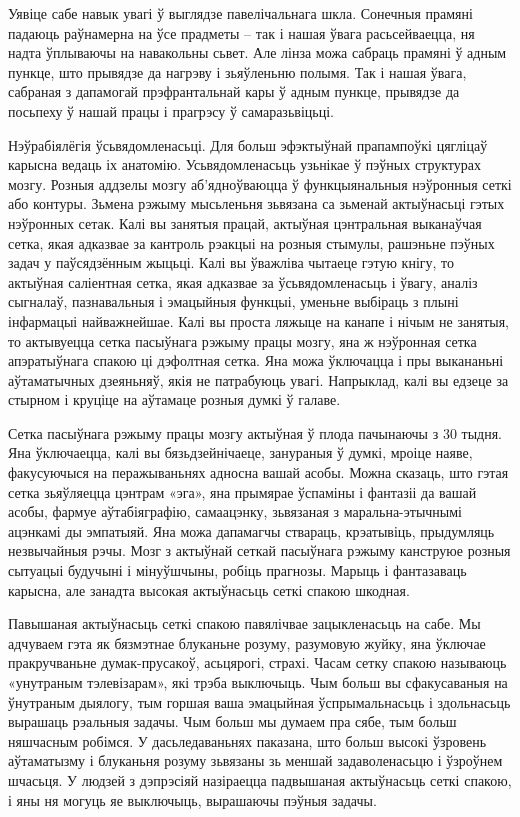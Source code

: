 Уявіце сабе навык увагі ў выглядзе павелічальнага шкла. Сонечныя прамяні падаюць раўнамерна на ўсе прадметы – так і нашая ўвага расьсейваецца, ня надта ўплываючы на навакольны сьвет. Але лінза можа сабраць прамяні ў адным пункце, што прывядзе да нагрэву і зьяўленьню полымя. Так і нашая ўвага, сабраная з дапамогай прэфрантальнай кары ў адным пункце, прывядзе да посьпеху ў нашай працы і прагрэсу ў самаразьвіцьці.

Нэўрабіялёгія ўсьвядомленасьці. Для больш эфэктыўнай прапампоўкі цягліцаў карысна ведаць іх анатомію. Усьвядомленасьць узьнікае ў пэўных структурах мозгу. Розныя аддзелы мозгу аб'ядноўваюцца ў функцыянальныя нэўронныя сеткі або контуры. Зьмена рэжыму мысьленьня зьвязана са зьменай актыўнасьці гэтых нэўронных сетак. Калі вы занятыя працай, актыўная цэнтральная выканаўчая сетка, якая адказвае за кантроль рэакцыі на розныя стымулы, рашэньне пэўных задач у паўсядзённым жыцьці. Калі вы ўважліва чытаеце гэтую кнігу, то актыўная саліентная сетка, якая адказвае за ўсьвядомленасьць і ўвагу, аналіз сыгналаў, пазнавальныя і эмацыйныя функцыі, уменьне выбіраць з плыні інфармацыі найважнейшае. Калі вы проста ляжыце на канапе і нічым не занятыя, то актывуецца сетка пасыўнага рэжыму працы мозгу, яна ж нэўронная сетка апэратыўнага спакою ці дэфолтная сетка. Яна можа ўключацца і пры выкананьні аўтаматычных дзеяньняў, якія не патрабуюць увагі. Напрыклад, калі вы едзеце за стырном і круціце на аўтамаце розныя думкі ў галаве.

Сетка пасыўнага рэжыму працы мозгу актыўная ў плода пачынаючы з 30 тыдня. Яна ўключаецца, калі вы бязьдзейнічаеце, занураныя ў думкі, мроіце наяве, факусуючыся на перажываньнях адносна вашай асобы. Можна сказаць, што гэтая сетка зьяўляецца цэнтрам «эга», яна прымярае ўспаміны і фантазіі да вашай асобы, фармуе аўтабіяграфію, самаацэнку, зьвязаная з маральна-этычнымі ацэнкамі ды эмпатыяй. Яна можа дапамагчы ствараць, крэатывіць, прыдумляць незвычайныя рэчы. Мозг з актыўнай сеткай пасыўнага рэжыму канструюе розныя сытуацыі будучыні і мінуўшчыны, робіць прагнозы. Марыць і фантазаваць карысна, але занадта высокая актыўнасьць сеткі спакою шкодная.

Павышаная актыўнасьць сеткі спакою павялічвае зацыкленасьць на сабе. Мы адчуваем гэта як бязмэтнае блуканьне розуму, разумовую жуйку, яна ўключае пракручваньне думак-прусакоў, асьцярогі, страхі. Часам сетку спакою называюць «унутраным тэлевізарам», які трэба выключыць. Чым больш вы сфакусаваныя на ўнутраным дыялогу, тым горшая ваша эмацыйная ўспрымальнасьць і здольнасьць вырашаць рэальныя задачы. Чым больш мы думаем пра сябе, тым больш няшчасным робімся. У дасьледаваньнях паказана, што больш высокі ўзровень аўтаматызму і блуканьня розуму зьвязаны зь меншай задаволенасьцю і ўзроўнем шчасьця. У людзей з дэпрэсіяй назіраецца падвышаная актыўнасьць сеткі спакою, і яны ня могуць яе выключыць, вырашаючы пэўныя задачы.

